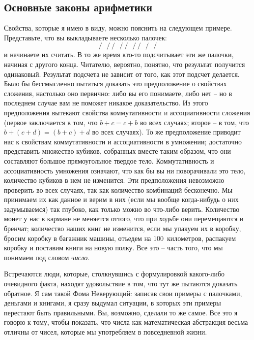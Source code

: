 \documentclass[../main.tex]{subfiles}
\begin{document}
\subsection{Основные законы арифметики}

Свойства, которые я имею в виду, можно пояснить на следующем примере. Представьте, что вы выкладываете несколько палочек:
\[
    \bm{/~~~/~/~~~/~/~~~/~/~~~/~~~/}
\]
и начинаете их считать. В то же время кто-то подсчитывает эти же палочки, начиная с другого конца. Читателю, вероятно, понятно, что результат получится одинаковый. Результат подсчета не зависит от того, как этот подсчет делается. Было бы бессмысленно пытаться доказать это предположение о свойствах сложения, настолько оно первично: либо вы его понимаете, либо нет \--- но в последнем случае вам не поможет никакое доказательство. Из этого предположения вытекают свойства коммутативности и ассоциативности сложения (первое заключается в том, что $b + c = c + b$ во всех случаях; второе \--- в том, что $b + (c + d) = (b + c) + d$ во всех случаях). То же предположение приводит нас к свойствам коммутативности и ассоциативности в умножении; достаточно представить множество кубиков, собранных вместе таким образом, что они составляют большое прямоугольное твердое тело. Коммутативность и ассоциативность умножения означают, что как бы вы ни поворачивали это тело, количество кубиков в нем не изменится. Эти предположения невозможно проверить во всех случаях, так как количество комбинаций бесконечно. Мы принимаем их как данное и верим в них (если мы вообще когда-нибудь о них задумываемся) так глубоко, как только можно во что-либо верить. Количество монет у нас в кармане не меняется оттого, что при ходьбе они перемещаются и бренчат; количество наших книг не изменится, если мы упакуем их в коробку, бросим коробку в багажник машины, отъедем на 100~километров, распакуем коробку и поставим книги на новую полку. Все это \--- часть того, что мы понимаем под словом \emph{число}.

Встречаются люди, которые, столкнувшись с формулировкой какого-либо очевидного факта, находят удовольствие в том, что тут же пытаются доказать обратное. Я сам такой Фома Неверующий: записав свои примеры с палочками, деньгами и книгами, я сразу выдумал ситуации, в которых эти примеры перестают быть правильными. Вы, возможно, сделали то же самое. Все это я говорю к тому, чтобы показать, что числа как математическая абстракция весьма отличны от чисел, которые мы употребляем в повседневной жизни.
\end{document}
